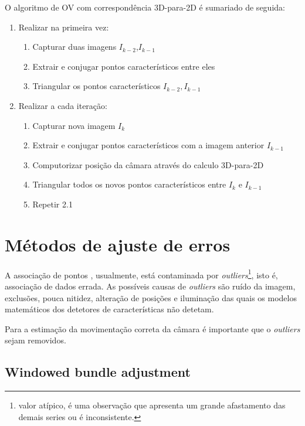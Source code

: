  O algoritmo de OV com correspondência 3D-para-2D é sumariado de seguida:
 \begin{enumerate}
 	\item Realizar na primeira vez:
 	\begin{enumerate}[label*=\arabic*.]
 		\item Capturar duas imagens \textit{$I_{k-2}$},\textit{$I_{k-1}$} 
 		\item Extrair e conjugar pontos característicos entre eles
 		\item Triangular os pontos característicos \textit{$I_{k-2},I_{k-1}$}
 	\end{enumerate}
 	\item Realizar a cada iteração:
 	\begin{enumerate}[label*=\arabic*.]
 		\item Capturar nova imagem \textit{$I_k$}
 		\item Extrair e conjugar pontos característicos com a imagem anterior \textit{$I_{k-1}$}
 		\item Computorizar posição da câmara através do calculo 3D-para-2D
 		\item Triangular todos os novos pontos característicos entre \textit{$I_k$} e \textit{$I_{k-1}$}
 		\item Repetir 2.1
 	\end{enumerate}
 	
 \end{enumerate}




\section{Métodos de ajuste de erros}

A associação de pontos , usualmente, está contaminada por \textit{outliers}\footnote{valor atípico, é uma observação que apresenta um grande afastamento das demais series ou é inconsistente.}, isto é, associação de dados errada. As possíveis causas de \textit{outliers} são ruído da imagem, exclusões, pouca nitidez, alteração de posições e iluminação das quais os modelos matemáticos dos detetores de características não detetam. 

Para  a estimação da movimentação correta da câmara é importante que o \textit{outliers} sejam removidos. 

\subsection{Windowed bundle adjustment}

